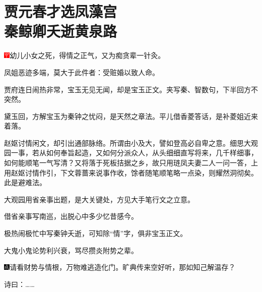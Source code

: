 

\chapter{贾元春才选凤藻宫\\秦鲸卿夭逝黄泉路}\label{part0020_split_000.htmlux5cux23calibre_pb_0}

{\includegraphics[width=3mm]{../Images/00002}\kaishu 幼儿小女之死，得情之正气，又为痴贪辈一针灸。}

{\kaishu 凤姐恶迹多端，莫大于此件者：受赃婚以致人命。}

{\kaishu 贾府连日闹热非常，宝玉无见无闻，却是宝玉正文。夹写秦、智数句，下半回方不突然。}

{\kaishu 黛玉回，方解宝玉为秦钟之忧闷，是天然之章法。平儿借香菱答话，是补菱姐近来着落。}

{\kaishu 赵妪讨情闲文，却引出通部脉络。所谓由小及大，譬如登高必自卑之意。细思大观园一事，若从如何奉旨起造，又如何分派众人，从头细细直写将来，几千样细事，如何能顺笔一气写清？又将落于死板拮据之乡，故只用琏凤夫妻二人一问一答，上用赵妪讨情作引，下文蓉蔷来说事作收，馀者随笔顺笔略一点染，则耀然洞彻矣。此是避难法。}

{\kaishu 大观园用省亲事出题，是大关键处，方见大手笔行文之立意。}

{\kaishu 借省亲事写南巡，出脱心中多少忆昔感今。}

{\kaishu 极热闹极忙中写秦钟夭逝，可知除``情''字，俱非宝玉正文。}

{\kaishu 大鬼小鬼论势利兴衰，骂尽攒炎附势之辈。}

{\includegraphics[width=3mm]{../Images/00005}请看财势与情根，万物难逃造化门。旷典传来空好听，那如知己解温存？}

诗曰：\ldots{}\ldots{}

